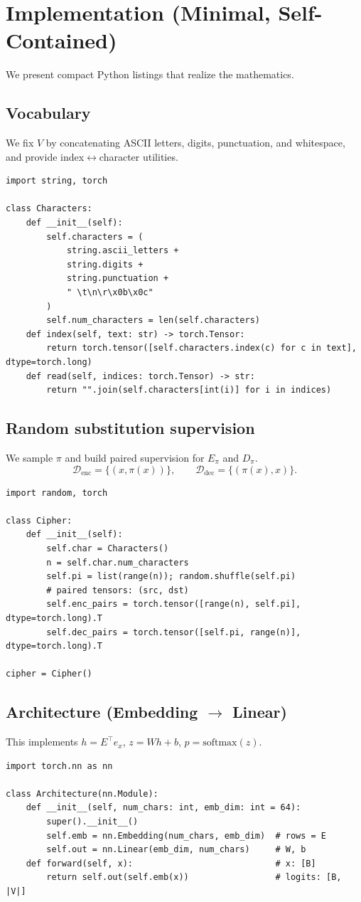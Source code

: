 \documentclass[12pt]{article}
\theoremstyle{plain}
\theoremstyle{remark}
\begin{document}
\section{Implementation (Minimal, Self-Contained)}
We present compact Python listings that realize the mathematics.

\subsection{Vocabulary}
We fix $V$ by concatenating ASCII letters, digits, punctuation, and whitespace, and provide index$\leftrightarrow$character utilities.
\begin{verbatim}
import string, torch

class Characters:
    def __init__(self):
        self.characters = (
            string.ascii_letters + 
            string.digits + 
            string.punctuation + 
            " \t\n\r\x0b\x0c"
        )
        self.num_characters = len(self.characters)
    def index(self, text: str) -> torch.Tensor:
        return torch.tensor([self.characters.index(c) for c in text], dtype=torch.long)
    def read(self, indices: torch.Tensor) -> str:
        return "".join(self.characters[int(i)] for i in indices)
\end{verbatim}

\subsection{Random substitution supervision}
We sample $\pi$ and build paired supervision for $E_\pi$ and $D_\pi$.
\[
\mathcal{D}_{\text{enc}}=\{(x,\pi(x))\},\qquad
\mathcal{D}_{\text{dec}}=\{(\pi(x),x)\}.
\]
\begin{verbatim}
import random, torch

class Cipher:
    def __init__(self):
        self.char = Characters()
        n = self.char.num_characters
        self.pi = list(range(n)); random.shuffle(self.pi)
        # paired tensors: (src, dst)
        self.enc_pairs = torch.tensor([range(n), self.pi], dtype=torch.long).T
        self.dec_pairs = torch.tensor([self.pi, range(n)], dtype=torch.long).T

cipher = Cipher()
\end{verbatim}

\subsection{Architecture (Embedding $\to$ Linear)}
This implements $h=E^\top e_x$, $z=Wh+b$, $p=\mathrm{softmax}(z)$.
\begin{verbatim}
import torch.nn as nn

class Architecture(nn.Module):
    def __init__(self, num_chars: int, emb_dim: int = 64):
        super().__init__()
        self.emb = nn.Embedding(num_chars, emb_dim)  # rows = E
        self.out = nn.Linear(emb_dim, num_chars)     # W, b
    def forward(self, x):                            # x: [B]
        return self.out(self.emb(x))                 # logits: [B, |V|]
\end{verbatim}
\end{document}
